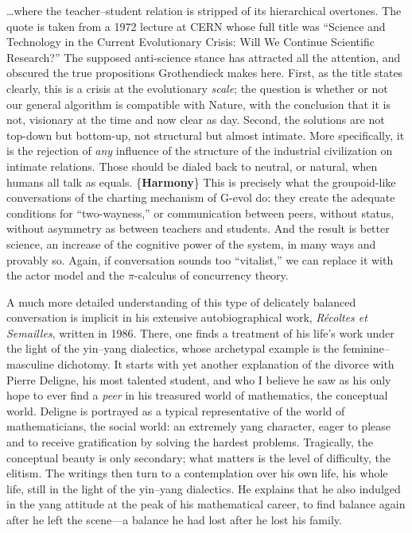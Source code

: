 \documentclass[11pt]{article}
\newcommand{\keyterm}[1]{\textbf{#1}}
\begin{document}
\noindent\ldots{}where the teacher--student relation is stripped of its
hierarchical overtones. The quote is taken from a 1972 lecture at CERN whose
full title was ``Science and Technology in the Current Evolutionary Crisis:
Will We Continue Scientific Research?'' The supposed anti-science stance has
attracted all the attention, and obscured the true propositions Grothendieck
makes here. First, as the title states clearly, this is a crisis at the
evolutionary \emph{scale}; the question is whether or not our general algorithm
is compatible with Nature, with the conclusion that it is not, visionary at the
time and now clear as day. Second, the solutions are not top-down but
bottom-up, not structural but almost intimate. More specifically, it is the
rejection of \emph{any} influence of the structure of the industrial
civilization on intimate relations. Those should be dialed back to neutral, or
natural, when humans all talk as equals. \{\keyterm{Harmony}\} This is precisely
what the groupoid-like conversations of the charting mechanism of G-evol do:
they create the adequate conditions for ``two-wayness,'' or communication
between peers, without status, without asymmetry as between teachers and
students. And the result is better science, an increase of the cognitive power
of the system, in many ways and provably so. Again, if conversation sounds too
``vitalist,'' we can replace it with the actor model and the \(\pi\)-calculus
of concurrency theory.

A much more detailed understanding of this type of delicately balanced
conversation is implicit in his extensive autobiographical work,
\emph{Récoltes et Semailles}, written in 1986. There, one finds a treatment of
his life's work under the light of the yin--yang dialectics, whose archetypal
example is the feminine--masculine dichotomy. It starts with yet another
explanation of the divorce with Pierre Deligne, his most talented student, and
who I believe he saw as his only hope to ever find a \emph{peer} in his
treasured world of mathematics, the conceptual world. Deligne is portrayed as a
typical representative of the world of mathematicians, the social world: an
extremely yang character, eager to please and to receive gratification by
solving the hardest problems. Tragically, the conceptual beauty is only
secondary; what matters is the level of difficulty, the elitism. The writings
then turn to a contemplation over his own life, his whole life, still in the
light of the yin--yang dialectics. He explains that he also indulged in the
yang attitude at the peak of his mathematical career, to find balance again
after he left the scene---a balance he had lost after he lost his family.
\end{document}
